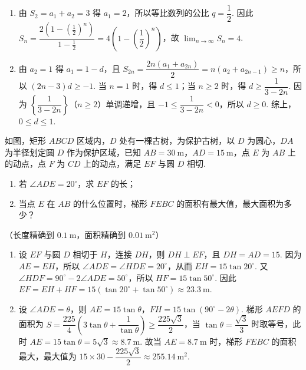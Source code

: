 \begin{solution}
\begin{enumerate}
\item 由 \(S_2=a_1+a_2=3\) 得 \(a_1=2\)，所以等比数列的公比 \(q=\dfrac12\). 因此 \(S_n=\dfrac{2\left(1-\left(\frac12\right)^n\right)}{1-\frac12}=4\left(1-\left(\dfrac12\right)^n\right)\)，故 \(\displaystyle\lim_{n\to\infty}S_n=4\).
\item 由 \(a_2=1\) 得 \(a_1=1-d\)，且 \(S_{2n}=\dfrac{2n(a_1+a_{2n})}{2}=n(a_2+a_{2n-1})\ge n\)，所以 \((2n-3)d\ge-1\). 当 \(n=1\) 时，得 \(d\le1\)；当 \(n\ge2\) 时，得 \(d\ge\dfrac1{3-2n}\). 因为 \(\left\{\dfrac1{3-2n}\right\}\)（\(n\ge2\)）单调递增，且 \(-1\le\dfrac1{3-2n}<0\)，所以 \(d\ge0\). 综上，\(0\le d\le1\).
\end{enumerate}
\end{solution}

\begin{problem}
如图，矩形 \(ABCD\) 区域内，\(D\) 处有一棵古树，为保护古树，以 \(D\) 为圆心，\(DA\) 为半径划定圆 \(D\) 作为保护区域，已知 \(AB=30\mathrm{~m}\)，\(AD=15\mathrm{~m}\)，点 \(E\) 为 \(AB\) 上的动点，点 \(F\) 为 \(CD\) 上的动点，满足 \(EF\) 与圆 \(D\) 相切.

\begin{enumerate}
\item 若 \(\angle ADE=20^\circ\)，求 \(EF\) 的长；
\item 当点 \(E\) 在 \(AB\) 的什么位置时，梯形 \(FEBC\) 的面积有最大值，最大面积为多少？
\end{enumerate}


（长度精确到 \(0.1\mathrm{~m}\)，面积精确到 \(0.01\mathrm{~m}^2\)）
\end{problem}

\begin{solution}
\begin{enumerate}
\item 设 \(EF\) 与圆 \(D\) 相切于 \(H\)，连接 \(DH\)，则 \(DH\perp EF\)，且 \(DH=AD=15\). 因为 \(AE=EH\)，所以 \(\angle ADE=\angle HDE=20^\circ\)，从而 \(EH=15\tan20^\circ\). 又 \(\angle HDF=90^\circ-2\angle ADE=50^\circ\)，所以 \(HF=15\tan50^\circ\). 因此 \(EF=EH+HF=15(\tan20^\circ+\tan50^\circ)\approx23.3\mathrm{~m}\).
\item 设 \(\angle ADE=\theta\)，则 \(AE=15\tan\theta\)，\(FH=15\tan(90^\circ-2\theta)\). 梯形 \(AEFD\) 的面积为
\(S=\dfrac{225}{4}\left(3\tan\theta+\dfrac1{\tan\theta}\right)\ge\dfrac{225\sqrt3}{2}\)，当 \(\tan\theta=\dfrac{\sqrt3}{3}\) 时取等号，此时 \(AE=15\tan\theta=5\sqrt3\approx8.7\mathrm{~m}\). 故当 \(AE=8.7\mathrm{~m}\) 时，梯形 \(FEBC\) 的面积最大，最大值为 \(15\times30-\dfrac{225\sqrt3}{2}\approx255.14\mathrm{~m}^2\).
\end{enumerate}
\end{solution}

